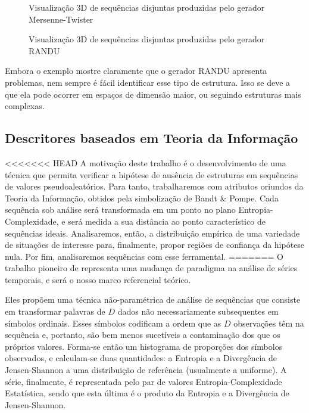 \begin{figure}[hbt]
\centering
{}
\caption{Visualização 3D de sequências disjuntas produzidas pelo gerador Mersenne-Twister}\label{fig:3DMT}
\end{figure}

\begin{figure}[hbt]
\centering
{}
\caption{Visualização 3D de sequências disjuntas produzidas pelo gerador RANDU}\label{fig:3DRandu}
\end{figure}

Embora o exemplo mostre claramente que o gerador RANDU apresenta problemas, nem sempre é fácil identificar esse tipo de estrutura.
Isso se deve a que ela pode ocorrer em espaços de dimensão maior, ou seguindo estruturas mais complexas.

\subsection{Descritores baseados em Teoria da Informação}

<<<<<<< HEAD
A motivação deste trabalho é o desenvolvimento de uma técnica que permita verificar a hipótese de ausência de estruturas em sequências de valores pseudoaleatórios.
Para tanto, trabalharemos com atributos oriundos da Teoria da Informação, obtidos pela simbolização de Bandt \& Pompe.
Cada sequência sob análise será transformada em um ponto no plano Entropia-Complexidade, e será medida a sua distância ao ponto característico de sequências ideais.
Analisaremos, então, a distribuição empírica de uma variedade de situações de interesse para, finalmente, propor regiões de confiança da hipótese nula.
Por fim, analisaremos sequências com esse ferramental.
=======
O trabalho pioneiro de \citet{PermutationEntropyBandtPompe} representa uma mudança de paradigma na análise de séries temporais, e será o nosso marco referencial teórico.

Eles propõem uma técnica não-paramétrica de análise de sequências que consiste em transformar palavras de $D$ dados não necessariamente subsequentes em símbolos ordinais.
Esses símbolos codificam a ordem que as $D$ observações têm na sequência e, portanto, são bem menos sucetíveis a contaminação dos que os próprios valores.
Forma-se então um histograma de proporções dos símbolos observados, e calculam-se duas quantidades: a Entropia e a Divergência de Jensen-Shannon a uma distribuição de referência (usualmente a uniforme).
A série, finalmente, é representada pelo par de valores Entropia-Complexidade Estatística, sendo que esta última é o produto da Entropia e a Divergência de Jensen-Shannon.

